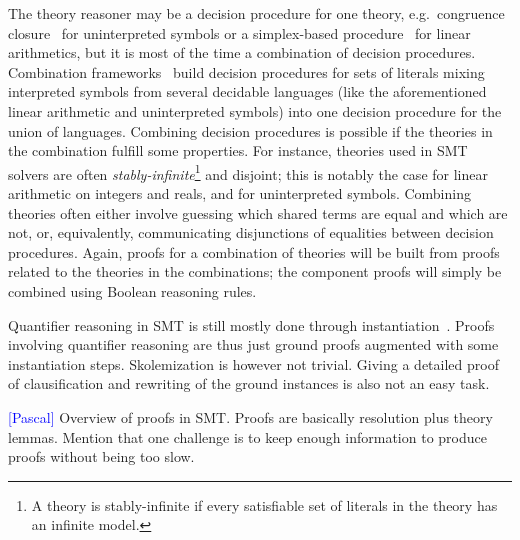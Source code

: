 \documentclass{llncs}
\newcommand{\Note}[1]{\textcolor{blue}{[#1]}}
\begin{document}
The theory reasoner may be a decision procedure for one theory, e.g.\ congruence
closure~\cite{Nelson2,Nieuwenhuis6} for uninterpreted symbols or a simplex-based
procedure~\cite{Dutertre1} for linear arithmetics, but it is most of the time a
combination of decision procedures.  Combination
frameworks~\cite{Nelson3,Tinelli1} build decision procedures for sets of
literals mixing interpreted symbols from several decidable languages (like the
aforementioned linear arithmetic and uninterpreted symbols) into one decision
procedure for the union of languages.  Combining decision procedures is possible
if the theories in the combination fulfill some properties.  For instance,
theories used in SMT solvers are often \emph{stably-infinite}\footnote{A theory
  is stably-infinite if every satisfiable set of literals in the theory has an
  infinite model.} and disjoint; this is notably the case for linear arithmetic
on integers and reals, and for uninterpreted symbols.  Combining theories often
either involve guessing which shared terms are equal and which are not, or,
equivalently, communicating disjunctions of equalities between decision
procedures.  Again, proofs for a combination of theories will be built from
proofs related to the theories in the combinations; the component proofs will
simply be combined using Boolean reasoning rules.

Quantifier reasoning in SMT is still mostly done through
instantiation~\cite{Moura9}.  Proofs involving quantifier reasoning are thus
just ground proofs augmented with some instantiation steps.  Skolemization is
however not trivial.  Giving a detailed proof of clausification and rewriting of
the ground instances is also not an easy task.



\Note{Pascal}
Overview of proofs in SMT.  Proofs are basically resolution plus theory
lemmas.  Mention that one challenge is to keep enough information to produce
proofs without being too slow.
\end{document}
